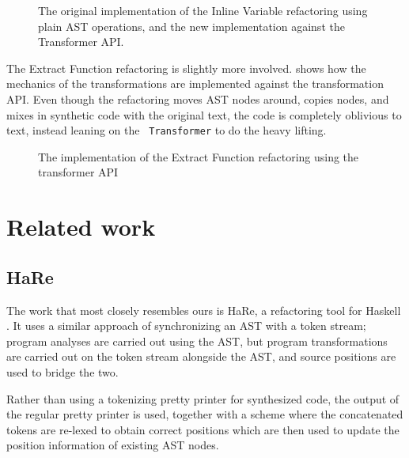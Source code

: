 
\begin{figure}
\begin{minipage}{\linewidth}

\end{minipage}
\begin{minipage}{\linewidth}

\end{minipage}
\caption{The original implementation of the Inline Variable refactoring using plain
AST operations, and the new implementation against the Transformer API.}
\label{Fig:InlineVariableComparison}
\end{figure}

The Extract Function refactoring is slightly more involved.
 shows how the mechanics of the transformations are
implemented against the transformation API. Even though the refactoring moves
AST nodes around, copies nodes, and mixes in synthetic code with the original
text, the code is completely oblivious to text, instead leaning on the {\tt
Transformer} to do the heavy lifting.

\begin{figure}

\caption{The implementation of the Extract Function refactoring using the transformer API}
\label{Fig:ExtractFunction}
\end{figure}

\section{Related work}

\subsection{HaRe}

The work that most closely resembles ours is HaRe, a refactoring tool for
Haskell \cite{HaRe}. It uses a similar approach of synchronizing an AST with a
token stream; program analyses are carried out using the AST, but program
transformations are carried out on the token stream alongside the AST, and
source positions are used to bridge the two.

Rather than using a tokenizing pretty printer for synthesized code, the output
of the regular pretty printer is used, together with a scheme where the
concatenated tokens are re-lexed to obtain correct positions which are then
used to update the position information of existing AST nodes.

